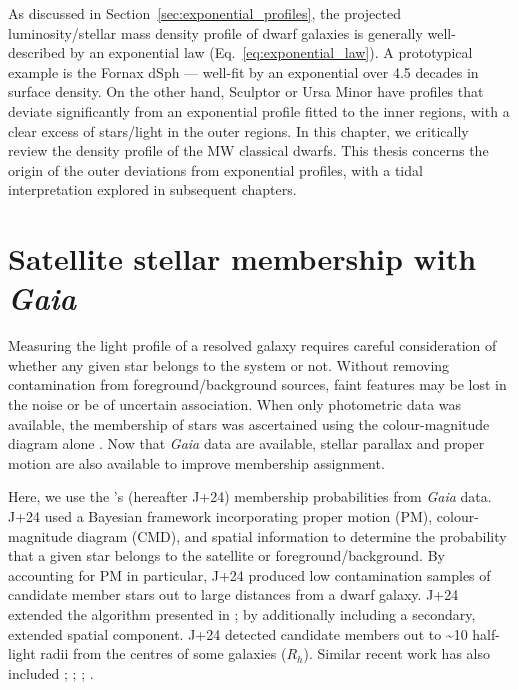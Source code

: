 As discussed in Section~\ref{sec:exponential_profiles}, the projected
luminosity/stellar mass density profile of dwarf galaxies is generally
well-described by an exponential law (Eq.~\ref{eq:exponential_law}). A
prototypical example is the Fornax dSph --- well-fit by an exponential
over 4.5 decades in surface density. On the other hand, Sculptor or Ursa
Minor have profiles that deviate significantly from an exponential
profile fitted to the inner regions, with a clear excess of stars/light
in the outer regions. In this chapter, we critically review the density
profile of the MW classical dwarfs. This thesis concerns the origin of
the outer deviations from exponential profiles, with a tidal
interpretation explored in subsequent chapters.

\section{\texorpdfstring{Satellite stellar membership with
\emph{Gaia}}{Satellite stellar membership with Gaia}}\label{satellite-stellar-membership-with-gaia}

Measuring the light profile of a resolved galaxy requires careful
consideration of whether any given star belongs to the system or not.
Without removing contamination from foreground/background sources, faint
features may be lost in the noise or be of uncertain association. When
only photometric data was available, the membership of stars was
ascertained using the colour-magnitude diagram alone \citep[e.g.,
matched filter methods like those used by][]{rockosi+2002}. Now that
\emph{Gaia} data are available, stellar parallax and proper motion are
also available to improve membership assignment.

Here, we use the \citet{jensen+2024}'s (hereafter J+24) membership
probabilities from \emph{Gaia} data. J+24 used a Bayesian framework
incorporating proper motion (PM), colour-magnitude diagram (CMD), and
spatial information to determine the probability that a given star
belongs to the satellite or foreground/background. By accounting for PM
in particular, J+24 produced low contamination samples of candidate
member stars out to large distances from a dwarf galaxy. J+24 extended
the algorithm presented in \citet{MV2020a}; \citet{MV2020b} by
additionally including a secondary, extended spatial component. J+24
detected candidate members out to \textasciitilde10 half-light radii
from the centres of some galaxies (\(R_h\)). Similar recent work has
also included \citet{pace+li2019}; \citet{battaglia+2022};
\citet{pace+erkal+li2022}; \citet{qi+2022}.

